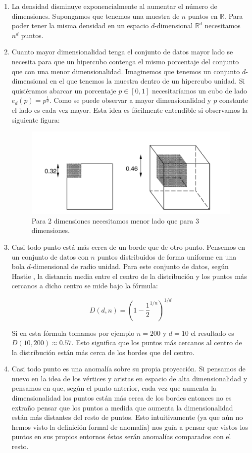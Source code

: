 \begin{enumerate}
	\item La densidad disminuye exponencialmente al aumentar el número de dimensiones. Supongamos que tenemos una muestra de $n$ puntos en $\mathbb{R}$. Para poder tener la misma densidad en un espacio $d$-dimensional $\mathbb{R}^d$ necesitamos $n^d$ puntos.
	\item Cuanto mayor dimensionalidad tenga el conjunto de datos mayor lado se necesita para que un hipercubo contenga el mismo porcentaje del conjunto que con una menor dimensionalidad. Imaginemos que tenemos un conjunto $d$-dimensional en el que tenemos la muestra dentro de un hipercubo unidad. Si quisiéramos abarcar un porcentaje $p\in [0,1]$ necesitaríamos un cubo de lado $e_d (p) = p^{\frac{1}{d}}$. Como se puede observar a mayor dimensionalidad y $p$ constante el lado es cada vez mayor. Esta idea es fácilmente entendible si observamos la siguiente figura:
	
	\begin{figure}[H]
		\centering
		\label{radio_alta_dimensionalidad}
		\includegraphics[scale=0.6]{imagenes/radio_alta_dimensionalidad}
		\caption{Para 2 dimensiones necesitamos menor lado que para 3 dimensiones. \cite[p.~64]{cherkassky_learning_2007}}
	\end{figure}
	\item Casi todo punto está más cerca de un borde que de otro punto. Pensemos en un conjunto de datos con $n$ puntos distribuidos de forma uniforme en una bola $d$-dimensional de radio unidad. Para este conjunto de datos, según Hastie \cite{hastie_t_elements_nodate}, la distancia media entre el centro de la distribución y los puntos más cercanos a dicho centro se mide bajo la fórmula:
	
	$$D(d,n) = (1-\frac{1}{2}^{1/n})^{1/d}$$
	
	Si en esta fórmula tomamos por ejemplo $n=200$ y $d=10$ el resultado es $D(10,200) \approx 0.57$. Esto significa que los puntos más cercanos al centro de la distribución están más cerca de los bordes que del centro.
	\item Casi todo punto es una anomalía sobre su propia proyección. Si pensamos de nuevo en la idea de los vértices y aristas en espacio de alta dimensionalidad y pensamos en que, según el punto anterior, cada vez que aumenta la dimensionalidad los puntos están más cerca de los bordes entonces no es extraño pensar que los puntos a medida que aumenta la dimensionalidad están más distantes del resto de puntos. Esto intuitivamente (ya que aún no hemos visto la definición formal de anomalía) nos guía a pensar que vistos los puntos en sus propios entornos éstos serán anomalías comparados con el resto.
	

\end{enumerate}
